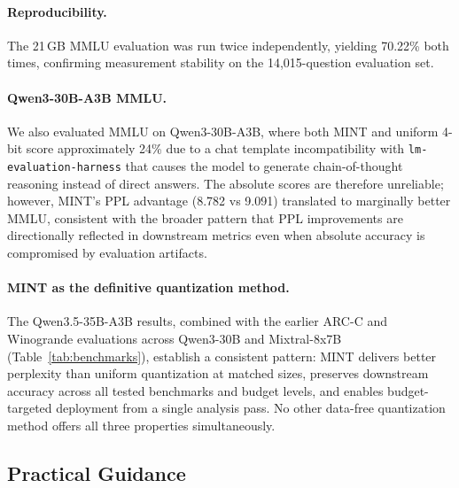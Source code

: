 \documentclass{article}
\begin{document}
\paragraph{Reproducibility.} The 21\,GB MMLU evaluation was run twice independently, yielding 70.22\% both times, confirming measurement stability on the 14{,}015-question evaluation set.

\paragraph{Qwen3-30B-A3B MMLU.} We also evaluated MMLU on Qwen3-30B-A3B, where both MINT and uniform 4-bit score approximately 24\% due to a chat template incompatibility with \texttt{lm-evaluation-harness} that causes the model to generate chain-of-thought reasoning instead of direct answers. The absolute scores are therefore unreliable; however, MINT's PPL advantage (8.782 vs 9.091) translated to marginally better MMLU, consistent with the broader pattern that PPL improvements are directionally reflected in downstream metrics even when absolute accuracy is compromised by evaluation artifacts.

\paragraph{MINT as the definitive quantization method.} The Qwen3.5-35B-A3B results, combined with the earlier ARC-C and Winogrande evaluations across Qwen3-30B and Mixtral-8x7B (Table~\ref{tab:benchmarks}), establish a consistent pattern: MINT delivers better perplexity than uniform quantization at matched sizes, preserves downstream accuracy across all tested benchmarks and budget levels, and enables budget-targeted deployment from a single analysis pass. No other data-free quantization method offers all three properties simultaneously.

\subsection{Practical Guidance}
\label{sec:practical_guidance}
\end{document}
